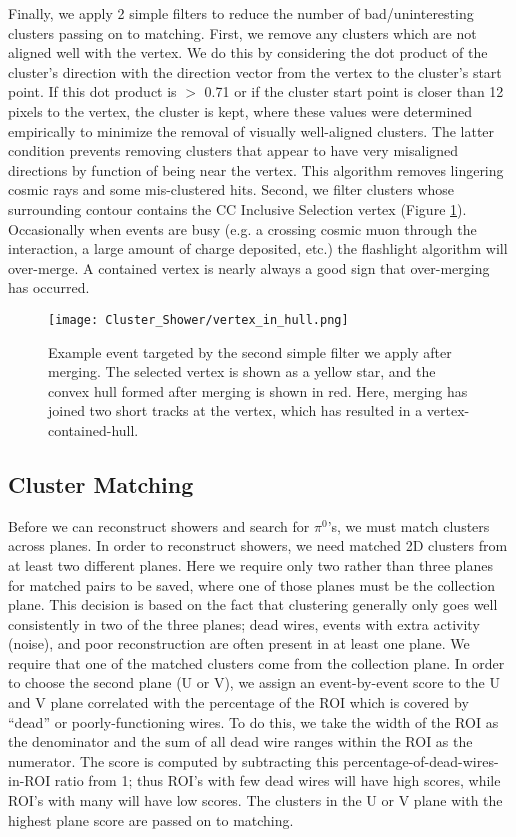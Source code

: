 \par Finally, we apply 2 simple filters to reduce the number of bad/uninteresting clusters passing on to matching. First, we remove any clusters which are not aligned well with the vertex.  We do this by considering the dot product of the cluster's direction with the direction vector from the vertex to the cluster's start point.  If this dot product is $>$ 0.71 or if the cluster start point is closer than 12 pixels to the vertex, the cluster is kept, where these values were determined empirically to minimize the removal of visually well-aligned clusters.  The latter condition prevents removing clusters that appear to have very misaligned directions by function of being near the vertex. This algorithm removes lingering cosmic rays and some mis-clustered hits. Second, we filter clusters whose surrounding contour contains the CC Inclusive Selection vertex (Figure \ref{fig:vertex_in_hull}). Occasionally when events are busy (e.g. a crossing cosmic muon through the interaction, a large amount of charge deposited, etc.) the flashlight algorithm will over-merge. A contained vertex is nearly always a good sign that over-merging has occurred.  

\begin{figure}[H]
\centering
\texttt{[image: Cluster\_Shower/vertex\_in\_hull.png]}
\caption{Example event targeted by the second simple filter we apply after merging. The selected vertex is shown as a yellow star, and the convex hull formed after merging is shown in red. Here, merging has joined two short tracks at the vertex, which has resulted in a vertex-contained-hull. }
\label{fig:vertex_in_hull}
\end{figure}


\subsection{Cluster Matching}
Before we can reconstruct showers and search for $\pi^{0}$'s, we must match clusters across planes.  In order to reconstruct showers, we need matched 2D clusters from at least two different planes. Here we require only two rather than three planes for matched pairs to be saved, where one of those planes must be the collection plane. This decision is based on the fact that clustering generally only goes well consistently in two of the three planes; dead wires, events with extra activity (noise), and poor reconstruction are often present in at least one plane. We require that one of the matched clusters come from the collection plane.  In order to choose the second plane (U or V), we assign an event-by-event score to the U and V plane correlated with the percentage of the ROI which is covered by ``dead'' or poorly-functioning wires.  
 To do this, we take the width of the ROI as the denominator and the sum of all dead wire ranges within the ROI as the numerator. The score is computed by subtracting this percentage-of-dead-wires-in-ROI ratio from 1; thus ROI's with few dead wires will have high scores, while ROI's with many will have low scores.  The clusters in the U or V plane with the highest plane score are passed on to matching. 


